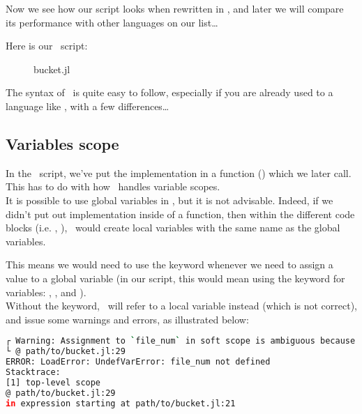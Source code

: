 Now we see how our script looks when rewritten in \julia, and later we will compare its performance with other languages on our list\dots
\\

\newpage

Here is our \julia\ script:

\begin{figure}[h]
	\caption{bucket.jl}
	
\end{figure}

\bigskip


The syntax of \julia\ is quite easy to follow, especially if you are already used to a language like \python, with a few differences\dots \\


\subsection*{Variables scope}

In the \julia\ script, we've put the implementation in a function () which we later call. This has to do with how \julia\ handles variable scopes. \\

It is possible to use global variables in \julia, but it is not advisable. Indeed, if we didn't put out implementation inside of a function, then within the different code blocks (i.e. , ), \julia\ would create local variables with the same name as the global variables. 

This means we would need to use the  keyword whenever we need to assign a value to a global variable (in our script, this would mean using the  keyword for variables: , , and ). \\


Without the  keyword, \julia\ will refer to a local variable instead (which is not correct), and issue some warnings and errors, as illustrated below: \\

\begin{lstlisting}[language=sh]
┌ Warning: Assignment to `file_num` in soft scope is ambiguous because a global variable by the same name exists: `file_num` will be treated as a new local. Disambiguate by using `local file_num` to suppress this warning or `global file_num` to assign to the existing global variable.
└ @ path/to/bucket.jl:29
ERROR: LoadError: UndefVarError: file_num not defined
Stacktrace:
[1] top-level scope
@ path/to/bucket.jl:29
in expression starting at path/to/bucket.jl:21
\end{lstlisting}

